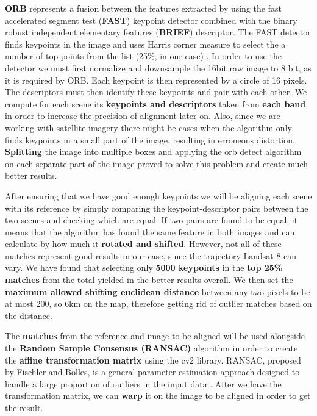 \documentclass[12pt, a4paper]{report}
\begin{document}
	\par \textbf{ORB} represents a fusion between the features extracted by using the fast accelerated segment test (\textbf{FAST}) keypoint detector combined with the binary robust independent elementary features (\textbf{BRIEF}) descriptor. The FAST detector finds keypoints in the image and uses Harris corner measure to select the a number of top points from the list (25\%, in our case) \cite{orb}. In order to use the detector we must first normalize and downsample the 16bit raw image to 8 bit, as it is required by ORB. Each keypoint is then represented by a circle of 16 pixels. The descriptors must then identify these keypoints and pair with each other.
	We compute for each scene its \textbf{keypoints and descriptors} taken from \textbf{each band}, in order to increase the precision of alignment later on. Also, since we are working with satellite imagery there might be cases when the algorithm only finds keypoints in a small part of the image, resulting in erroneous distortion. \textbf{Splitting} the image into multiple boxes and applying the orb detect algorithm on each separate part of the image proved to solve this problem and create much better results. 
	
	\par After ensuring that we have good enough keypoints we will be aligning each scene with its reference by simply comparing the keypoint-descriptor pairs between the two scenes and checking which are equal. If two pairs are found to be equal, it means that the algorithm has found the same feature in both images and can calculate by how much it \textbf{rotated and shifted}. However, not all of these matches represent good results in our case, since the trajectory Landsat 8 can vary. We have found that selecting only \textbf{5000 keypoints} in the \textbf{top 25\% matches} from the total yielded in the better results overall. We then set the \textbf{maximum allowed shifting euclidean distance} between any two pixels to be at most 200, so 6km on the map, therefore getting rid of outlier matches based on the distance.
	
	\par The \textbf{matches} from the reference and image to be aligned will be used alongside the \textbf{Random Sample Consensus (RANSAC)} algorithm in order to create the \textbf{affine transformation matrix} using the cv2 library. RANSAC, proposed by Fischler and Bolles, is a general parameter estimation approach designed to handle a large proportion of outliers in the input data \cite{Fischler1981}. After we have the transformation matrix, we can \textbf{warp} it on the image to be aligned in order to get the result. 
	
\end{document}
